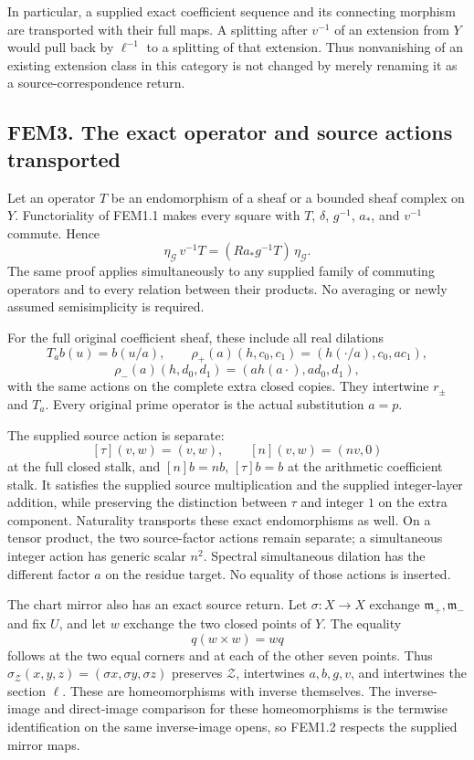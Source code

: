In particular, a supplied exact coefficient sequence and its connecting
morphism are transported with their full maps. A splitting after
\(v^{-1}\) of an extension from \(Y\) would pull back by \(\ell^{-1}\)
to a splitting of that extension. Thus nonvanishing of an existing
extension class in this category is not changed by merely renaming it as
a source-correspondence return.

\subsection{FEM3. The exact operator and source actions
transported}\label{fem3.-the-exact-operator-and-source-actions-transported}

Let an operator \(T\) be an endomorphism of a sheaf or a bounded sheaf
complex on \(Y\). Functoriality of FEM1.1 makes every square with \(T\),
\(\delta\), \(g^{-1}\), \(a_*\), and \(v^{-1}\) commute. Hence \[
\eta_{\mathcal G}\,v^{-1}T
=(Ra_*g^{-1}T)\,\eta_{\mathcal G}.
\tag{FEM3.1}
\] The same proof applies simultaneously to any supplied family of
commuting operators and to every relation between their products. No
averaging or newly assumed semisimplicity is required.

For the full original coefficient sheaf, these include all real
dilations \[
T_a b(u)=b(u/a),\qquad
\rho_+(a)(h,c_0,c_1)=(h(\cdot/a),c_0,ac_1),
\] \[
\rho_-(a)(h,d_0,d_1)=(a h(a\cdot),ad_0,d_1),
\tag{FEM3.2}
\] with the same actions on the complete extra closed copies. They
intertwine \(r_\pm\) and \(T_a\). Every original prime operator is the
actual substitution \(a=p\).

The supplied source action is separate: \[
[\tau](v,w)=(v,w),\qquad [n](v,w)=(nv,0)
\] at the full closed stalk, and \([n]b=nb\), \([\tau]b=b\) at the
arithmetic coefficient stalk. It satisfies the supplied source
multiplication and the supplied integer-layer addition, while preserving
the distinction between \(\tau\) and integer \(1\) on the extra
component. Naturality transports these exact endomorphisms as well. On a
tensor product, the two source-factor actions remain separate; a
simultaneous integer action has generic scalar \(n^2\). Spectral
simultaneous dilation has the different factor \(a\) on the residue
target. No equality of those actions is inserted.

The chart mirror also has an exact source return. Let \(\sigma:X\to X\)
exchange \(\mathfrak m_+,\mathfrak m_-\) and fix \(U\), and let \(w\)
exchange the two closed points of \(Y\). The equality \[
q(w\times w)=wq
\] follows at the two equal corners and at each of the other seven
points. Thus \(\sigma_{\mathcal Z}(x,y,z)=(\sigma x,\sigma y,\sigma z)\)
preserves \(\mathcal Z\), intertwines \(a,b,g,v\), and intertwines the
section \(\ell\). These are homeomorphisms with inverse themselves. The
inverse-image and direct-image comparison for these homeomorphisms is
the termwise identification on the same inverse-image opens, so FEM1.2
respects the supplied mirror maps.

